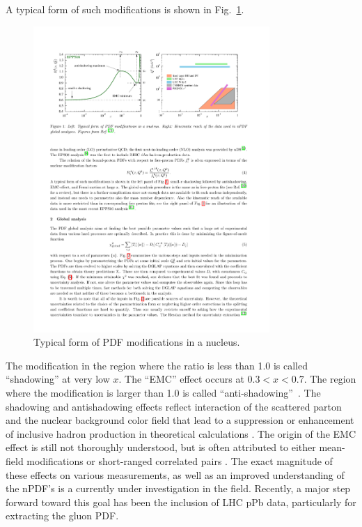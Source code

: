 A typical form of such modifications is shown in Fig.~\ref{fig:cnm_cartoon}.

\begin{figure}[htpb]
  \centering
  \includegraphics[width=0.8\textwidth]{Introduction/cnm_cartoon}
  \caption{Typical form of PDF modifications in a nucleus\cite{Pumplin2001}.}
  \label{fig:cnm_cartoon}
\end{figure}

The modification in the region where the ratio is less than 1.0 is called ``shadowing'' at very low $x$.  The ``EMC'' effect occurs at  $0.3 < x < 0.7$. The region where the modification is larger than 1.0 is called ``anti-shadowing''~\cite{Pumplin2001}. The shadowing and antishadowing effects reflect interaction of the scattered parton and the nuclear background color field that lead to a suppression or enhancement of inclusive hadron production in theoretical calculations \cite{epps16:2017}. The origin of the EMC effect is still not thoroughly understood, but is often attributed to either mean-field modifications or short-ranged correlated pairs \cite{Hen2017a,Norton2003a}. The exact magnitude of these effects on various measurements, as well as an improved understanding of the nPDF's is a currently under investigation in the field. Recently, a major step forward toward this goal has been the inclusion of LHC pPb data, particularly for extracting the gluon PDF.
